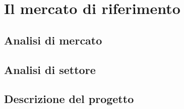 \section{Il mercato di riferimento}\label{sec:whattheproblemis}
\subsection{Analisi di mercato}

\subsection{Analisi di settore}

\subsection{Descrizione del progetto}
